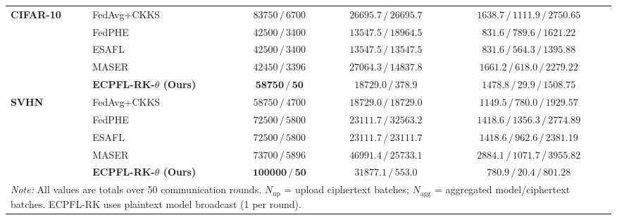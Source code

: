 \begin{table}[t]
{\begin{tabular}{ll c c c}
\multirow{5}{*}{\textbf{CIFAR-10}} 
& FedAvg+CKKS & $83750 \,/\, 6700$ & $26695.7 \,/\, 26695.7$ & $1638.7 \,/\, 1111.9 \,/\, 2750.65$ \\
& FedPHE & $42500 \,/\, 3400$ & $13547.5 \,/\, 18964.5$ & $831.6 \,/\, 789.6 \,/\, 1621.22$ \\
& ESAFL & $42500 \,/\, 3400$ & $13547.5 \,/\, 13547.5$ & $831.6 \,/\, 564.3 \,/\, 1395.88$ \\
& MASER & $42450 \,/\, 3396$ & $27064.3 \,/\, 14837.8$ & $1661.2 \,/\, 618.0 \,/\, 2279.22$ \\
\rowcolor{gray!15}
& \textbf{ECPFL-RK-$\theta$ (Ours)} & $\mathbf{58750} \,/\, \mathbf{50}$ & $\mathbf{18729.0} \,/\, \mathbf{378.9}$ & $\mathbf{1478.8} \,/\, \mathbf{29.9} \,/\, \mathbf{1508.75}$ \\
\midrule

\multirow{5}{*}{\textbf{SVHN}} 
& FedAvg+CKKS & $58750 \,/\, 4700$ & $18729.0 \,/\, 18729.0$ & $1149.5 \,/\, 780.0 \,/\, 1929.57$ \\
& FedPHE & $72500 \,/\, 5800$ & $23111.7 \,/\, 32563.2$ & $1418.6 \,/\, 1356.3 \,/\, 2774.89$ \\
& ESAFL & $72500 \,/\, 5800$ & $23111.7 \,/\, 23111.7$ & $1418.6 \,/\, 962.6 \,/\, 2381.19$ \\
& MASER & $73700 \,/\, 5896$ & $46991.4 \,/\, 25733.1$ & $2884.1 \,/\, 1071.7 \,/\, 3955.82$ \\
\rowcolor{gray!15}
& \textbf{ECPFL-RK-$\theta$ (Ours)} & $\mathbf{100000} \,/\, \mathbf{50}$ & $\mathbf{31877.1} \,/\, \mathbf{553.0}$ & $\mathbf{780.9} \,/\, \mathbf{20.4} \,/\, \mathbf{801.28}$ \\

\bottomrule
\multicolumn{5}{l}{\scriptsize \textit{Note:} All values are totals over 50 communication rounds. $N_{\mathrm{up}}$ = upload ciphertext batches; $N_{\mathrm{agg}}$ = aggregated model/ciphertext batches. ECPFL-RK uses plaintext model broadcast (1 per round).}
\end{tabular}
}
\end{table}